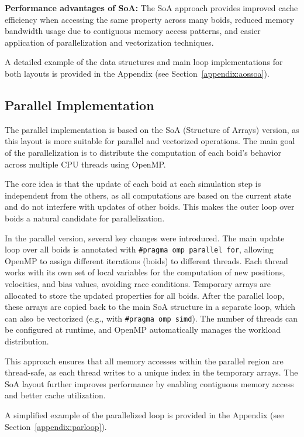 \documentclass[10pt,twocolumn,letterpaper]{article}
\begin{document}
\textbf{Performance advantages of SoA:}
The SoA approach provides improved cache efficiency when accessing the same property across many boids, reduced memory bandwidth usage due to contiguous memory access patterns, and easier application of parallelization and vectorization techniques.

A detailed example of the data structures and main loop implementations for both layouts is provided in the Appendix (see Section~\ref{appendix:aossoa}).

\subsection{Parallel Implementation}
The parallel implementation is based on the SoA (Structure of Arrays) version, as this layout is more suitable for parallel and vectorized operations. The main goal of the parallelization is to distribute the computation of each boid's behavior across multiple CPU threads using OpenMP.

The core idea is that the update of each boid at each simulation step is independent from the others, as all computations are based on the current state and do not interfere with updates of other boids. This makes the outer loop over boids a natural candidate for parallelization.

In the parallel version, several key changes were introduced. The main update loop over all boids is annotated with \texttt{\#pragma omp parallel for}, allowing OpenMP to assign different iterations (boids) to different threads. Each thread works with its own set of local variables for the computation of new positions, velocities, and bias values, avoiding race conditions. Temporary arrays are allocated to store the updated properties for all boids. After the parallel loop, these arrays are copied back to the main SoA structure in a separate loop, which can also be vectorized (e.g., with \texttt{\#pragma omp simd}). The number of threads can be configured at runtime, and OpenMP automatically manages the workload distribution.

This approach ensures that all memory accesses within the parallel region are thread-safe, as each thread writes to a unique index in the temporary arrays. The SoA layout further improves performance by enabling contiguous memory access and better cache utilization.

A simplified example of the parallelized loop is provided in the Appendix (see Section~\ref{appendix:parloop}).
\end{document}

